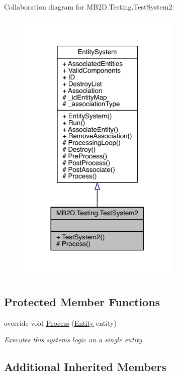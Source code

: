 Collaboration diagram for M\+B2\+D.\+Testing.\+Test\+System2\+:
\nopagebreak
\begin{figure}[H]
\begin{center}
\leavevmode
\includegraphics[width=218pt]{class_m_b2_d_1_1_testing_1_1_test_system2__coll__graph}
\end{center}
\end{figure}
\subsection*{Protected Member Functions}
\begin{DoxyCompactItemize}
\item 
override void \hyperlink{class_m_b2_d_1_1_testing_1_1_test_system2_a0fbdd06fd0de796cfec32b7e025f73fe}{Process} (\hyperlink{class_m_b2_d_1_1_entity_component_1_1_entity}{Entity} entity)
\begin{DoxyCompactList}\small\item\em Executes this systems logic on a single entity \end{DoxyCompactList}\end{DoxyCompactItemize}
\subsection*{Additional Inherited Members}


